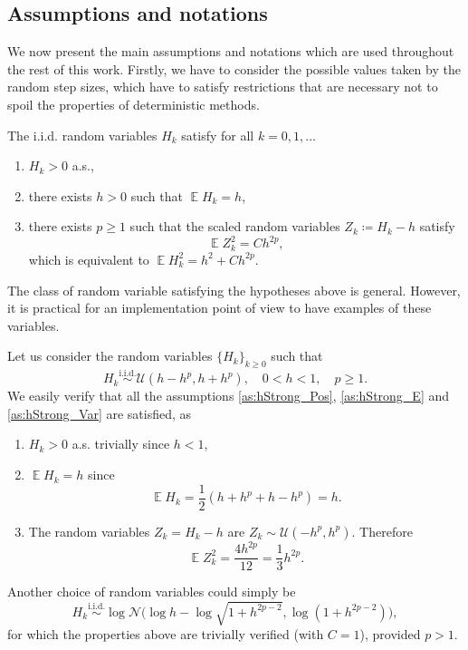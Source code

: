 \documentclass{siamart1116}
\numberwithin{theorem}{section}
\newcommand{\iid}{\ensuremath{\stackrel{\text{i.i.d.}}{\sim}}}
\newcommand{\defeq}{\coloneqq}
\newcommand{\E}{\operatorname{\mathbb{E}}}
\begin{document}
\subsection{Assumptions and notations} We now present the main assumptions and notations which are used throughout the rest of this work. Firstly, we have to consider the possible values taken by the random step sizes, which have to satisfy restrictions that are necessary not to spoil the properties of deterministic methods. 
\begin{assumption}\label{as:hStrong} The i.i.d. random variables $H_k$ satisfy for all $k = 0, 1, \ldots$
	\begin{enumerate}
		\item\label{as:hStrong_Pos} $H_k > 0$ a.s.,
		\item\label{as:hStrong_E} there exists $h > 0$ such that $\E H_k = h$,
		\item\label{as:hStrong_Var} there exists $p \geq 1$ such that the scaled random variables $Z_k \defeq H_k - h$ satisfy
		\begin{equation}
		\E Z_k^2 = Ch^{2p},
		\end{equation}
		which is equivalent to $\E H_k^2 = h^2 + Ch^{2p}$.
	\end{enumerate}
\end{assumption}
The class of random variable satisfying the hypotheses above is general. However, it is practical for an implementation point of view to have examples of these variables.
\begin{example}\label{ex:uniformH} Let us consider the random variables $\{H_k\}_{k\geq 0}$ such that
	\begin{equation}
	H_k \iid \mathcal{U}(h-h^p, h+h^p), \quad 0 < h < 1, \quad p \geq 1.
	\end{equation}
	We easily verify that all the assumptions \ref{as:hStrong_Pos}, \ref{as:hStrong_E} and \ref{as:hStrong_Var} are satisfied, as 
	\begin{enumerate}
		\item $H_k > 0$ a.s. trivially since $h < 1$,
		\item $\E H_k = h$ since 
		\begin{equation}
		\E H_k = \frac{1}{2}(h + h^p + h - h^p) = h.
		\end{equation}
		\item The random variables $Z_k = H_k - h$ are $Z_k \sim \mathcal{U}(-h^p, h^p)$. Therefore
		\begin{equation}
		\E Z_k^2 = \frac{4h^{2p}}{12} = \frac{1}{3}h^{2p}.
		\end{equation}
	\end{enumerate}
	Another choice of random variables could simply be 
	\begin{equation}
	H_k \iid \log\mathcal{N}\big(\log h - \log\sqrt{1 + h^{2p - 2}}, \log(1 + h^{2p-2})\big),
	\end{equation}
	for which the properties above are trivially verified (with $C = 1$), provided $p > 1$.
\end{example}
\end{document}
